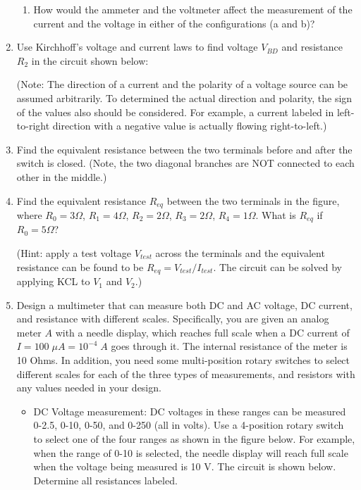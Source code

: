 \begin{enumerate}
\begin{enumerate}
\item How would the ammeter and the voltmeter affect the measurement of the
	current and the voltage in either of the configurations (a and b)?
\end{enumerate}

\item Use Kirchhoff's voltage and current laws to find voltage $V_{BD}$ and resistance 
$R_2$ in the circuit shown below:


(Note: The direction of a current and the polarity of a voltage source can
be assumed arbitrarily. To determined the actual direction and polarity, the
sign of the values also should be considered. For example, a current labeled 
in left-to-right direction with a negative value is actually flowing 
right-to-left.)

\item Find the equivalent resistance between the two terminals before and
after the switch is closed. (Note, the two diagonal branches are NOT
connected to each other in the middle.)


\item Find the equivalent resistance $R_{eq}$ between the two terminals
in the figure, where $R_0=3\Omega$, $R_1=4\Omega$, $R_2=2\Omega$, $R_3=2\Omega$, 
$R_4=1\Omega$. What is $R_{eq}$ if $R_0=5\Omega$?

(Hint: apply a test voltage $V_{test}$ across the terminals and the 
equivalent resistance can be found to be $R_{eq}=V_{test}/I_{test}$.
The circuit can be solved by applying KCL to $V_1$ and $V_2$.)


\item Design a multimeter that can measure both DC and AC voltage, DC current,
  and resistance with different scales. Specifically, you are given an analog 
  meter $A$ with a needle display, which reaches full scale when a DC current 
  of $I=100\;\mu A=10^{-4}\;A$ goes through it. The internal resistance of the
  meter is 10 Ohms. In addition, you need some multi-position rotary switches 
  to select different scales for each of the three types of measurements, and 
  resistors with any values needed in your design.

  \begin{itemize}
    \item DC Voltage measurement: DC voltages in these ranges can be measured
      0-2.5, 0-10, 0-50, and 0-250 (all in volts). Use a 4-position rotary switch
      to select one of the four ranges as shown in the figure below. For example, 
      when the range of 0-10 is selected, the needle display will reach full scale 
      when the voltage being measured is 10 V. The circuit is shown below. Determine 
      all resistances labeled.


\end{itemize}
\end{enumerate}

